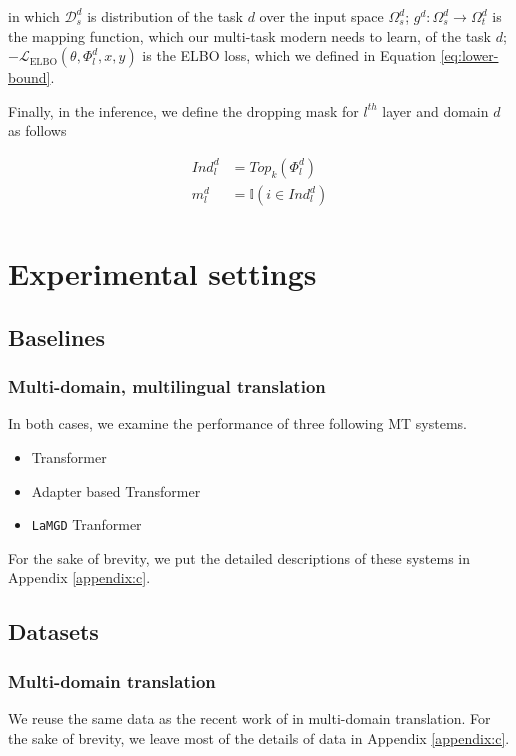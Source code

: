 \documentclass[11pt]{article}
\newcommand{\system}[1]{\texttt{{#1}}}
\begin{document}
in which $\mathcal{D}_s^d$ is distribution of the task $d$ over the input space $\Omega^d_s$; $g^d: \Omega^d_s \rightarrow \Omega^d_t$ is the mapping function, which our multi-task modern needs to learn, of the task $d$; $-\mathcal{L}_{\text{ELBO}}(\theta,\Phi_l^d,x,y)$ is the ELBO loss, which we defined in Equation \ref{eq:lower-bound}.

Finally, in the inference, we define the dropping mask for $l^{th}$ layer and domain $d$ as follows

\begin{align*}
Ind_l^d &= Top_k(\Phi_l^d) \\
m_l^d &= \mathbb{I}(i\in Ind_l^d)\\
\end{align*}

\section{Experimental settings}
\subsection{Baselines}
\subsubsection{Multi-domain, multilingual translation}
In both cases, we examine the performance of three following MT systems.
\begin{itemize}
	\item Transformer
	\item Adapter based Transformer
	\item \system{LaMGD} Tranformer
\end{itemize}
For the sake of brevity, we put the detailed descriptions of these systems in Appendix \ref{appendix:c}.
\subsection{Datasets}
\subsubsection{Multi-domain translation}
We reuse the same data as the recent work of \citet{Pham21revisiting} in multi-domain translation. For the sake of brevity, we leave most of the details of data in Appendix \ref{appendix:c}.
\end{document}
